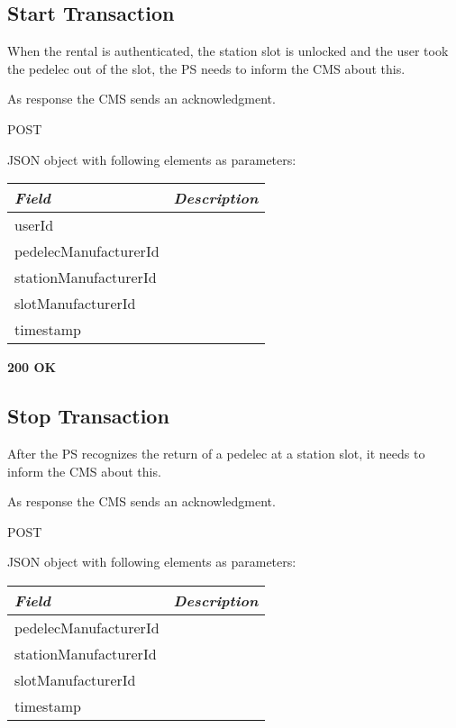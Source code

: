 
\subsection{Start Transaction}

When the rental is authenticated, the station slot is unlocked and the user took the pedelec out of the slot, the \acs{PS} needs to inform the \acs{CMS} about this.

As response the \acs{CMS} sends an acknowledgment.


 POST

JSON object with following elements as parameters:\\
\begin{tabularx}{\linewidth}{ | l | X | }
  \hline
  \textit{Field} & \textit{Description} \\
  \hline \hline
  	userId 		& \\
  	pedelecManufacturerId			& \\
  	stationManufacturerId			& \\
  	slotManufacturerId			& \\
  	timestamp					& \\
  	
    \hline
\end{tabularx}

\textbf{200 OK}\\


\subsection{Stop Transaction}

After the \acs{PS} recognizes the return of a pedelec at a station slot, it needs to inform the \acs{CMS} about this.

As response the \acs{CMS} sends an acknowledgment.


 POST

JSON object with following elements as parameters:\\
\begin{tabularx}{\linewidth}{ | l | X | }
  \hline
  \textit{Field} & \textit{Description} \\
  \hline \hline
  	pedelecManufacturerId			& \\
  	stationManufacturerId			& \\
  	slotManufacturerId			& \\
  	timestamp					& \\
  	
    \hline
\end{tabularx}

